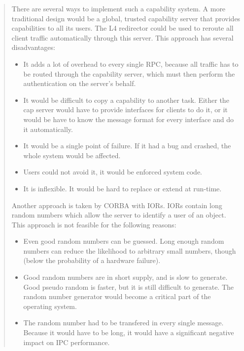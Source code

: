 \documentclass[9pt,a4paper]{extarticle}
\newenvironment{comment}{\footnotesize \begin{quote}}{\end{quote}}
\begin{document}
\begin{comment}
  There are several ways to implement such a capability system.  A
  more traditional design would be a global, trusted capability server
  that provides capabilities to all its users.  The L4 redirector
  could be used to reroute all client traffic automatically through
  this server.  This approach has several disadvantages:

  \begin{itemize}
  \item It adds a lot of overhead to every single RPC, because all
    traffic has to be routed through the capability server, which must
    then perform the authentication on the server's behalf.
  \item It would be difficult to copy a capability to another task.
    Either the cap server would have to provide interfaces for clients
    to do it, or it would be have to know the message format for every
    interface and do it automatically.
  \item It would be a single point of failure.  If it had a bug and
    crashed, the whole system would be affected.
  \item Users could not avoid it, it would be enforced system code.
  \item It is inflexible.  It would be hard to replace or extend at
    run-time.
  \end{itemize}
  
  Another approach is taken by CORBA with IORs.  IORs contain long
  random numbers which allow the server to identify a user of an
  object.  This approach is not feasible for the following reasons:

  \begin{itemize}
  \item Even good random numbers can be guessed.  Long enough random
    numbers can reduce the likelihood to arbitrary small numbers,
    though (below the probability of a hardware failure).
  \item Good random numbers are in short supply, and is slow to
    generate.  Good pseudo random is faster, but it is still difficult
    to generate.  The random number generator would become a critical
    part of the operating system.
  \item The random number had to be transfered in every single
    message.  Because it would have to be long, it would have a
    significant negative impact on IPC performance.
  \end{itemize}
\end{comment}
\end{document}

